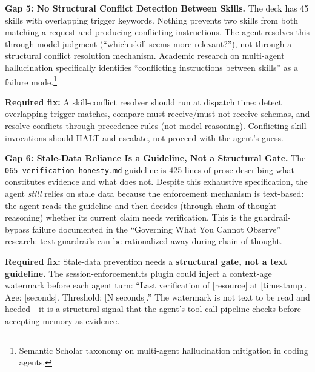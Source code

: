 \documentclass[11pt,a4paper]{article}
\begin{document}
\begin{gapbox}
\textbf{Gap 5: No Structural Conflict Detection Between Skills.}  The deck has 45 skills with overlapping trigger keywords.  Nothing prevents two skills from both matching a request and producing conflicting instructions.  The agent resolves this through model judgment (``which skill seems more relevant?''), not through a structural conflict resolution mechanism.  Academic research on multi-agent hallucination specifically identifies ``conflicting instructions between skills'' as a failure mode.\footnote{Semantic Scholar taxonomy on multi-agent hallucination mitigation in coding agents.}

\textbf{Required fix:}  A skill-conflict resolver should run at dispatch time: detect overlapping trigger matches, compare must-receive/must-not-receive schemas, and resolve conflicts through precedence rules (not model reasoning).  Conflicting skill invocations should HALT and escalate, not proceed with the agent's guess.
\end{gapbox}

\begin{gapbox}
\textbf{Gap 6: Stale-Data Reliance Is a Guideline, Not a Structural Gate.}  The \texttt{065-verification-honesty.md} guideline is 425 lines of prose describing what constitutes evidence and what does not.  Despite this exhaustive specification, the agent \emph{still} relies on stale data because the enforcement mechanism is text-based: the agent reads the guideline and then decides (through chain-of-thought reasoning) whether its current claim needs verification.  This is the guardrail-bypass failure documented in the ``Governing What You Cannot Observe'' research: text guardrails can be rationalized away during chain-of-thought.

\textbf{Required fix:}  Stale-data prevention needs a \textbf{structural gate, not a text guideline.}  The session-enforcement.ts plugin could inject a context-age watermark before each agent turn: ``Last verification of [resource] at [timestamp].  Age: [seconds].  Threshold: [N seconds].''  The watermark is not text to be read and heeded---it is a structural signal that the agent's tool-call pipeline checks before accepting memory as evidence.
\end{gapbox}
\end{document}
